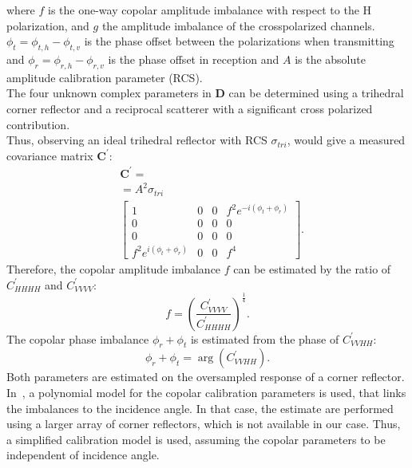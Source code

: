 where $f$ is the one-way copolar amplitude imbalance with respect to the H polarization, and $g$ the amplitude imbalance of the crosspolarized channels. $\phi_t = \phi_{t,h} -\phi_{t,v}$ is the phase offset between the polarizations when transmitting and $\phi_{r} = \phi_{r,h} -\phi_{r,v}$ is the phase offset in reception and $A$ is the absolute amplitude calibration parameter (RCS)\cite{Ainsworth2006a, Fore2015}.\\
The four unknown complex parameters in $\mathbf{D}$ can be determined using a trihedral corner reflector and a reciprocal scatterer with a significant cross polarized contribution\cite{Sarabandi1990,Pipia2009}.\\
Thus, observing an ideal trihedral reflector with RCS $\sigma_{tri}$, would give 
a measured covariance matrix $\mathbf{C}^{\prime}$:
\begin{equation}
	\begin{aligned}
	&\mathbf{C}^{\prime} =\\
	&= A^2 \sigma_{tri}\\
	&\begin{bmatrix}
		1 & 0 & 0 & f^2 e^{-i \left(\phi_t + \phi_r\right)}\\
		0 & 0 & 0 & 0\\
		0 & 0 & 0 & 0\\
		f^2 e^{i \left(\phi_t + \phi_r\right)} & 0 & 0 & f^4
	\end{bmatrix}.
	\end{aligned}
\end{equation}
Therefore, the  copolar amplitude imbalance $f$ can be estimated by the ratio of $C_{HHHH}^\prime$ and $C_{VVVV}^\prime$:
\begin{equation}
	f = \left(\frac{C^{\prime}_{VVVV}}{C^{\prime}_{HHHH}}\right)^{\frac{1}{4}}.
\end{equation}
The copolar phase imbalance $\phi_r + \phi_t$ is estimated from the phase of $C_{VVHH}^{\prime}$:
\begin{equation}
	\phi_r + \phi_t = \operatorname{arg}\left(C_{VVHH}^\prime\right).
\end{equation}
Both parameters are estimated on the oversampled response of a corner reflector. In~\cite{Fore2015}, a polynomial model for the copolar calibration parameters is used, that links the imbalances to the incidence angle. In that case, the estimate are performed using a larger array of corner reflectors, which is not available in our case. Thus, a simplified calibration model is used, assuming the copolar parameters to be independent of incidence angle.\\ 
